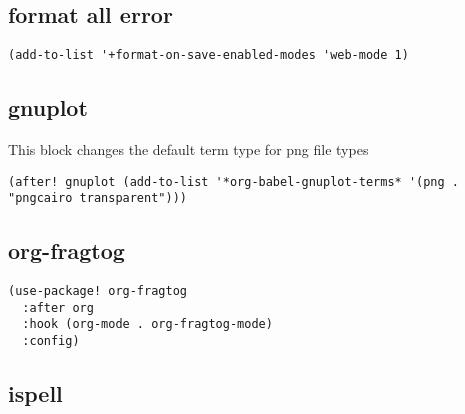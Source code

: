 \documentclass{assignments}
\begin{document}
\subsection*{format all error}
\label{sec:orgb54ac59}
\begin{verbatim}
(add-to-list '+format-on-save-enabled-modes 'web-mode 1)
\end{verbatim}
\subsection*{gnuplot}
\label{sec:org0797a64}
This block changes the default term type for png file types
\begin{verbatim}
(after! gnuplot (add-to-list '*org-babel-gnuplot-terms* '(png . "pngcairo transparent")))
\end{verbatim}
\subsection*{org-fragtog}
\label{sec:org1af9b08}
\begin{verbatim}
(use-package! org-fragtog
  :after org
  :hook (org-mode . org-fragtog-mode)
  :config)
\end{verbatim}
\subsection*{ispell}
\label{sec:org08a6e0c}
\end{document}
